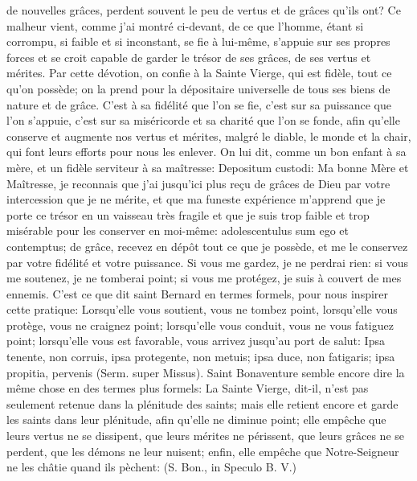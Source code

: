 de nouvelles grâces, perdent souvent le peu de vertus et de grâces qu'ils ont? Ce malheur vient, comme j'ai
montré ci-devant, de ce que l'homme, étant si corrompu, si faible et si inconstant, se fie à lui-même, s'appuie sur
ses propres forces et se croit capable de garder le trésor de ses grâces, de ses vertus et mérites. Par cette
dévotion, on confie à la Sainte Vierge, qui est fidèle, tout ce qu'on possède; on la prend pour la dépositaire
universelle de tous ses biens de nature et de grâce. C'est à sa fidélité que l'on se fie, c'est sur sa puissance que
l'on s'appuie, c'est sur sa miséricorde et sa charité que l'on se fonde, afin qu'elle conserve et augmente nos vertus
et mérites, malgré le diable, le monde et la chair, qui font leurs efforts pour nous les enlever. On lui dit, comme un
bon enfant à sa mère, et un fidèle serviteur à sa maîtresse: Depositum custodi: Ma bonne Mère et Maîtresse, je
reconnais que j'ai jusqu'ici plus reçu de grâces de Dieu par votre intercession que je ne mérite, et que ma funeste
expérience m'apprend que je porte ce trésor en un vaisseau très fragile et que je suis trop faible et trop misérable
pour les conserver en moi-même: adolescentulus sum ego et contemptus; de grâce, recevez en dépôt tout ce que
je possède, et me le conservez par votre fidélité et votre puissance. Si vous me gardez, je ne perdrai rien: si vous
me soutenez, je ne tomberai point; si vous me protégez, je suis à couvert de mes ennemis.
 C'est ce que dit saint Bernard en termes formels, pour nous inspirer cette pratique: Lorsqu'elle vous soutient,
vous ne tombez point, lorsqu'elle vous protège, vous ne craignez point; lorsqu'elle vous conduit, vous ne vous
fatiguez point; lorsqu'elle vous est favorable, vous arrivez jusqu'au port de salut: Ipsa tenente, non corruis, ipsa
protegente, non metuis; ipsa duce, non fatigaris; ipsa propitia, pervenis (Serm. super Missus). Saint Bonaventure
semble encore dire la même chose en des termes plus formels: La Sainte Vierge, dit-il, n'est pas seulement
retenue dans la plénitude des saints; mais elle retient encore et garde les saints dans leur plénitude, afin qu'elle ne
diminue point; elle empêche que leurs vertus ne se dissipent, que leurs mérites ne périssent, que leurs grâces ne
se perdent, que les démons ne leur nuisent; enfin, elle empêche que Notre-Seigneur ne les châtie quand ils
pèchent:  (S. Bon., in Speculo B. V.)
